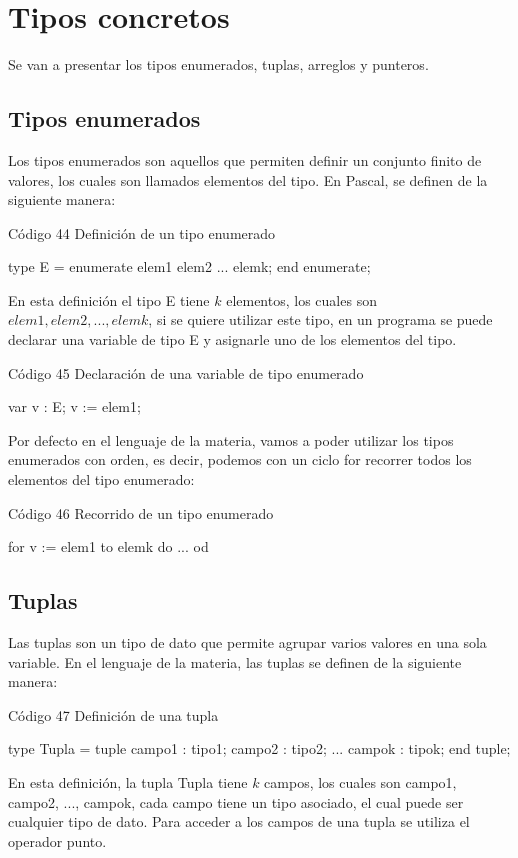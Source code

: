 \chapter{Tipos concretos}
Se van a presentar los tipos enumerados, tuplas, arreglos y punteros.

\section{Tipos enumerados}
Los tipos enumerados son aquellos que permiten definir un conjunto finito de valores, los cuales son llamados elementos del tipo. En Pascal, se definen de la siguiente manera:
\begin{codebox}{Código 44}
\footnotesize Definición de un tipo enumerado
\tcblower
\begin{pascallike}
type E = enumerate
            elem1
            elem2
            ...
            elemk;
        end enumerate;
\end{pascallike}
\end{codebox}
En esta definición el tipo E tiene $k$ elementos, los cuales son $elem1, elem2, ..., elemk$, si se quiere utilizar este tipo, en un programa se puede declarar una variable de tipo E y asignarle uno de los elementos del tipo.
\begin{codebox}{Código 45}
\footnotesize Declaración de una variable de tipo enumerado
\tcblower
\begin{pascallike}
var v : E;
v := elem1;
\end{pascallike}
\end{codebox}
Por defecto en el lenguaje de la materia, vamos a poder utilizar los tipos enumerados con orden, es decir, podemos con un ciclo for recorrer todos los elementos del tipo enumerado:
\begin{codebox}{Código 46}
\footnotesize Recorrido de un tipo enumerado
\tcblower
\begin{pascallike}
for v := elem1 to elemk do ... od
\end{pascallike}
\end{codebox}

\section{Tuplas}
Las tuplas son un tipo de dato que permite agrupar varios valores en una sola variable. En el lenguaje de la materia, las tuplas se definen de la siguiente manera:
\begin{codebox}{Código 47}
\footnotesize Definición de una tupla
\tcblower
\begin{pascallike}
type Tupla = tuple
                campo1 : tipo1;
                campo2 : tipo2;
                ...
                campok : tipok;
            end tuple;
\end{pascallike}
\end{codebox}
En esta definición, la tupla Tupla tiene $k$ campos, los cuales son campo1, campo2, ..., campok, cada campo tiene un tipo asociado, el cual puede ser cualquier tipo de dato. Para acceder a los campos de una tupla se utiliza el operador punto.

